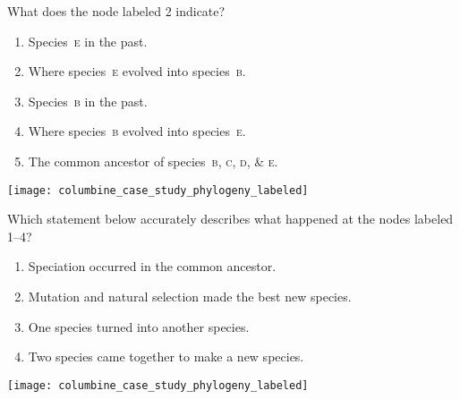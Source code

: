 \documentclass[t,hidelinks]{beamer}
\newcommand{\ques}[1]{\highlight{\textsc{q#1:}}}
\begin{document}
%
{
\begin{frame}[t]{\ques4  What does the node labeled 2 indicate?}
	
	\begin{multicols}{2}
	\begin{enumerate}
		\item Species~\textsc{e} in the past.
		
		\item Where species~\textsc{e} evolved into species~\textsc{b}.
		
		\item Species~\textsc{b} in the past.

		\item Where species~\textsc{b} evolved into species~\textsc{e}.


		\item \alert<2>{The common ancestor of species~\textsc{b}, \textsc{c}, \textsc{d}, \& \textsc{e}.}

	\end{enumerate}
	
	\columnbreak
	
		\hfill \texttt{[image: columbine\_case\_study\_phylogeny\_labeled]}
	\end{multicols}
		
\end{frame}
}
%
\begin{frame}[t]{\ques5 Which statement below accurately describes what happened at the nodes labeled 1–4?}

	\begin{multicols}{2}
	\begin{enumerate}
		\item \alert<2>{Speciation occurred in the common ancestor.}
		
		\item Mutation and natural selection made the best new species.  
		
		\item One species turned into another species.
		
		\item Two species came together to make a new species.
	\end{enumerate}
	
	\columnbreak
	
	\hfill \texttt{[image: columbine\_case\_study\_phylogeny\_labeled]}
	\end{multicols}
		
\end{frame}
\end{document}
